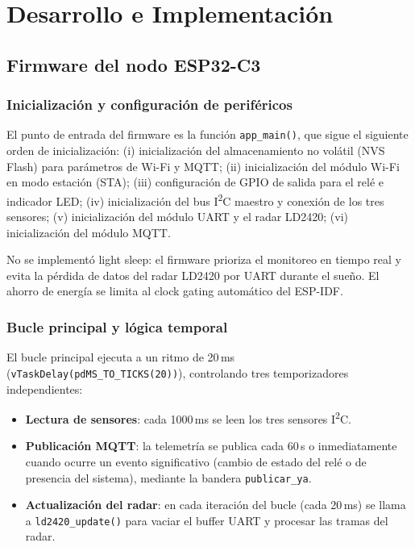 
\section{Desarrollo e Implementación}
\label{sec:desarrollo}

\subsection{Firmware del nodo ESP32-C3}

\subsubsection{Inicialización y configuración de periféricos}

El punto de entrada del firmware es la función \texttt{app\_main()}, que sigue el
siguiente orden de inicialización: (i) inicialización del almacenamiento no volátil
(NVS Flash) para parámetros de Wi-Fi y MQTT; (ii) inicialización del módulo Wi-Fi
en modo estación (STA); (iii) configuración de GPIO de salida para el relé e
indicador LED; (iv) inicialización del bus I\textsuperscript{2}C maestro y conexión
de los tres sensores; (v) inicialización del módulo UART y el radar LD2420; (vi) inicialización del módulo MQTT.

No se implementó light sleep: el firmware prioriza el monitoreo en tiempo real y
evita la pérdida de datos del radar LD2420 por UART durante el sueño. El ahorro
de energía se limita al clock gating automático del ESP-IDF.

\subsubsection{Bucle principal y lógica temporal}

El bucle principal ejecuta a un ritmo de 20\,ms (\texttt{vTaskDelay(pdMS\_TO\_TICKS(20))}),
controlando tres temporizadores independientes:

\begin{itemize}
  \item \textbf{Lectura de sensores}: cada 1000\,ms se leen los tres sensores
        I\textsuperscript{2}C.
  \item \textbf{Publicación MQTT}: la telemetría se publica cada 60\,s o
        inmediatamente cuando ocurre un evento significativo (cambio de estado del
        relé o de presencia del sistema), mediante la bandera \texttt{publicar\_ya}.
  \item \textbf{Actualización del radar}: en cada iteración del bucle (cada 20\,ms)
        se llama a \texttt{ld2420\_update()} para vaciar el buffer UART y procesar
        las tramas del radar.
\end{itemize}

